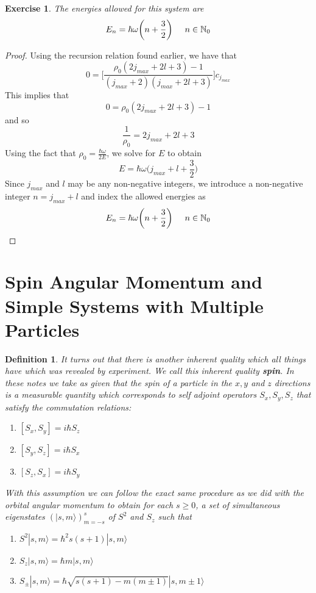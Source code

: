 \documentclass[12pt]{amsart}
\newtheorem{defn}[thm]{Definition}
\newtheorem{ex}[thm]{Exercise}
\renewcommand{\r}{\rangle}
\newcommand{\om}{\omega}
\newcommand{\N}{\mathbb{N}}
\begin{document}
\begin{ex}
The energies allowed for this system are $$E_n = \hbar \om \bigg(n+\frac{3}{2} \bigg) \hspace{.5cm}n \in \N_0$$
\end{ex}

\begin{proof}
Using the recursion relation found earlier, we have that $$0 = \bigg[ \frac{\rho_0(2j_{max}+2l+3)-1}{(j_{max}+2)(j_{max}+2l+3)}\bigg]c_{j_{max}} $$ This implies that $$0 = \rho_0(2j_{max}+2l+3)-1$$ and so $$\frac{1}{\rho_0} = 2j_{max} + 2l +3$$ Using the fact that $\rho_0 = \frac{\hbar \om}{2E}$, we solve for $E$ to obtain $$E = \hbar \om \bigg( j_{max} + l + \frac{3}{2}\bigg)$$ Since $j_{max}$ and $l$ may be any non-negative integers, we introduce a non-negative integer $n = j_{max}+l$ and index the allowed energies as $$E_n = \hbar \om\bigg(n+ \frac{3}{2} \bigg) \hspace{.5cm} n \in \N_0$$
\end{proof}
\newpage

\section{Spin Angular Momentum and Simple Systems with Multiple Particles}

\begin{defn}
It turns out that there is another inherent quality which all things have which was revealed by experiment. We call this inherent quality \textbf{spin}. In these notes we take as given that the spin of a particle in the $x,y$ and $z$ directions is a measurable quantity which  corresponds to self adjoint operators $S_x, S_y, S_z$ that satisfy the commutation relations: 
\begin{enumerate}
\item $[S_x, S_y] = i\hbar S_z$
\item $[S_y, S_z] = i\hbar S_x$
\item $[S_z, S_x] = i\hbar S_y$
\end{enumerate}
With this assumption we can follow the exact same procedure as we did with the orbital angular momentum  to obtain for each $s \geq 0$, a set of simultaneous eigenstates $(|s, m \r)_{m=-s}^s$ of $S^2$ and $S_z$ such that 
\begin{enumerate}
\item $S^2|s, m \r = \hbar^2 s(s+1)|s, m \r$
\item $S_z |s, m \r = \hbar m |s, m \r$
\item $S_{\pm}|s, m \r = \hbar\sqrt{s(s+1) - m(m \pm 1)}|s, m \pm 1 \r$
\end{enumerate} 
\end{defn}

\newpage
\end{document}
